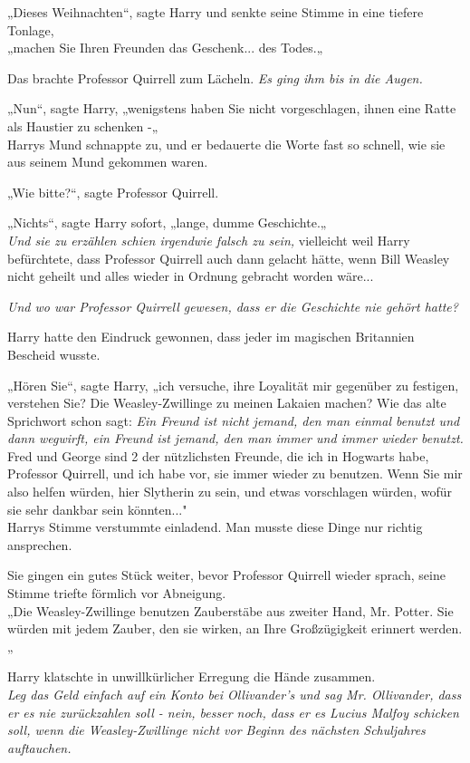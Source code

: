 {„Dieses Weihnachten“, sagte Harry und senkte seine Stimme in eine tiefere Tonlage,\\ „machen Sie Ihren Freunden das Geschenk... des Todes.„

Das brachte Professor Quirrell zum Lächeln. \emph{Es ging ihm bis in die Augen.}

„Nun“, sagte Harry, „wenigstens haben Sie nicht vorgeschlagen, ihnen eine Ratte als Haustier zu schenken -„\\ Harrys Mund schnappte zu, und er bedauerte die Worte fast so schnell, wie sie aus seinem Mund gekommen waren.

„Wie bitte?“, sagte Professor Quirrell.

„Nichts“, sagte Harry sofort, „lange, dumme Geschichte.„\\ \emph{Und sie zu erzählen schien irgendwie falsch zu sein,} vielleicht weil Harry befürchtete, dass Professor Quirrell auch dann gelacht hätte, wenn Bill Weasley nicht geheilt und alles wieder in Ordnung gebracht worden wäre...

\emph{Und wo war Professor Quirrell gewesen, dass er die Geschichte nie gehört hatte?}

Harry hatte den Eindruck gewonnen, dass jeder im magischen Britannien Bescheid wusste.

„Hören Sie“, sagte Harry, „ich versuche, ihre Loyalität mir gegenüber zu festigen, verstehen Sie? Die Weasley-Zwillinge zu meinen Lakaien machen? Wie das alte Sprichwort schon sagt: \emph{Ein Freund ist nicht jemand, den man einmal benutzt und dann wegwirft, ein Freund ist jemand, den man immer und immer wieder benutzt.}\\ Fred und George sind 2 der nützlichsten Freunde, die ich in Hogwarts habe, Professor Quirrell, und ich habe vor, sie immer wieder zu benutzen. Wenn Sie mir also helfen würden, hier Slytherin zu sein, und etwas vorschlagen würden, wofür sie sehr dankbar sein könnten..."\\ Harrys Stimme verstummte einladend. Man musste diese Dinge nur richtig ansprechen.

Sie gingen ein gutes Stück weiter, bevor Professor Quirrell wieder sprach, seine Stimme triefte förmlich vor Abneigung.\\ „Die Weasley-Zwillinge benutzen Zauberstäbe aus zweiter Hand, Mr. Potter. Sie würden mit jedem Zauber, den sie wirken, an Ihre Großzügigkeit erinnert werden.„

Harry klatschte in unwillkürlicher Erregung die Hände zusammen.\\ \emph{Leg das Geld einfach auf ein Konto bei Ollivander's und sag Mr. Ollivander, dass er es nie zurückzahlen soll - nein, besser noch, dass er es Lucius Malfoy schicken soll, wenn die Weasley-Zwillinge nicht vor Beginn des nächsten Schuljahres auftauchen.}

}
